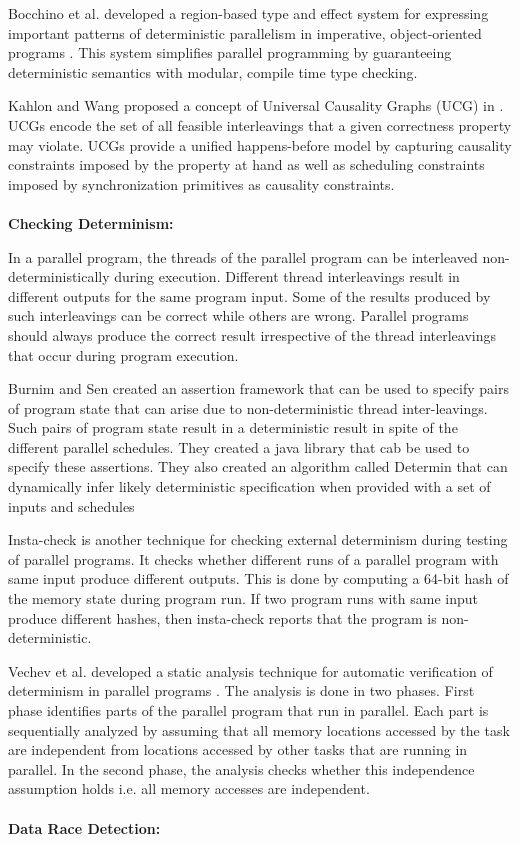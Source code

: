 Bocchino et al. developed a region-based type and effect system for expressing important patterns of deterministic parallelism in imperative, object-oriented programs \cite{bocchino2009type}. This system simplifies parallel programming by guaranteeing deterministic semantics with modular, compile time type checking.

Kahlon and Wang proposed a concept of Universal Causality Graphs (UCG) in \cite{kahlon2010universal}. UCGs encode the set of all feasible interleavings that a given correctness property may violate. UCGs provide a unified happens-before model by capturing causality constraints imposed by the property at hand as well as scheduling constraints imposed by synchronization primitives as causality constraints.\\
\\
\textbf{Checking Determinism: }

In a parallel program, the threads of the parallel program can be interleaved non-deterministically during execution. Different thread interleavings result in different outputs for the same program input. Some of the results produced by such interleavings can be correct while others are wrong. Parallel programs should always produce the correct result irrespective of the thread interleavings that occur during program execution.

Burnim and Sen created an assertion framework that can be used to specify pairs of program state that can arise due to non-deterministic thread inter-leavings\cite{burnim2009asserting}. Such pairs of program state result in a deterministic result in spite of the different parallel schedules. They created a java library that cab be used to specify these assertions. They also created an algorithm called Determin \cite{burnim2010determin} that can dynamically infer likely deterministic specification when provided with a set of inputs and schedules

Insta-check \cite{nistor2010instantcheck} is another technique for checking external determinism during testing of parallel programs. It checks whether different runs of a parallel program with same input produce different outputs. This is done by computing a 64-bit hash of the memory state during program run. If two program runs with same input produce different hashes, then insta-check reports that the program is non-deterministic. 

Vechev et al. developed a static analysis technique for automatic verification of determinism in parallel programs \cite{vechev2011automatic}. The analysis is done in two phases. First phase identifies parts of the parallel program that run in parallel. Each part is sequentially analyzed by assuming that all memory locations accessed by the task are independent from locations accessed by other tasks that are running in parallel. In the second phase, the analysis checks whether this independence assumption holds i.e. all memory accesses are independent.
\\
\\
\textbf{Data Race Detection: }

